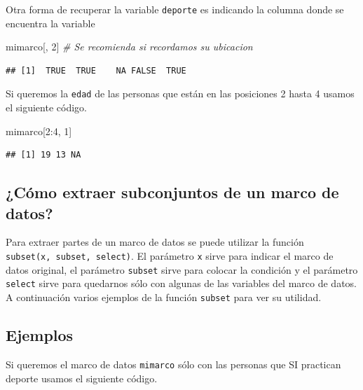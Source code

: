 \documentclass[10pt,]{krantz}
\makeatletter
\newenvironment{Shaded}{\begin{snugshade}}{\end{snugshade}}
\newcommand{\DecValTok}[1]{\textcolor[rgb]{0.00,0.00,0.81}{{#1}}}
\newcommand{\CommentTok}[1]{\textcolor[rgb]{0.56,0.35,0.01}{\textit{{#1}}}}
\newcommand{\NormalTok}[1]{{#1}}
\newenvironment{kframe}{%
\medskip{}
\setlength{\fboxsep}{.8em}
 \def\at@end@of@kframe{}%
 \ifinner\ifhmode%
  \def\at@end@of@kframe{\end{minipage}}%
  \begin{minipage}{\columnwidth}%
 \fi\fi%
 \def\FrameCommand##1{\hskip\@totalleftmargin \hskip-\fboxsep
 \colorbox{shadecolor}{##1}\hskip-\fboxsep
     \hskip-\linewidth \hskip-\@totalleftmargin \hskip\columnwidth}%
 \MakeFramed {\advance\hsize-\width
   \@totalleftmargin\z@ \linewidth\hsize
   \@setminipage}}%
 {\par\unskip\endMakeFramed%
 \at@end@of@kframe}
\renewenvironment{Shaded}{\begin{kframe}}{\end{kframe}}
\makeatother
\begin{document}
Otra forma de recuperar la variable \texttt{deporte} es indicando la
columna donde se encuentra la variable

\begin{Shaded}
\begin{Highlighting}[]
\NormalTok{mimarco[, }\DecValTok{2}\NormalTok{]  }\CommentTok{# Se recomienda si recordamos su ubicacion}
\end{Highlighting}
\end{Shaded}

\begin{verbatim}
## [1]  TRUE  TRUE    NA FALSE  TRUE
\end{verbatim}

Si queremos la \texttt{edad} de las personas que están en las posiciones
2 hasta 4 usamos el siguiente código.

\begin{Shaded}
\begin{Highlighting}[]
\NormalTok{mimarco[}\DecValTok{2}\NormalTok{:}\DecValTok{4}\NormalTok{, }\DecValTok{1}\NormalTok{]}
\end{Highlighting}
\end{Shaded}

\begin{verbatim}
## [1] 19 13 NA
\end{verbatim}

\subsection{\texorpdfstring{¿Cómo extraer subconjuntos de un marco de
datos?
}{¿Cómo extraer subconjuntos de un marco de datos? }}\label{como-extraer-subconjuntos-de-un-marco-de-datos}

Para extraer partes de un marco de datos se puede utilizar la función
\texttt{subset(x,\ subset,\ select)}. El parámetro \texttt{x} sirve para
indicar el marco de datos original, el parámetro \texttt{subset} sirve
para colocar la condición y el parámetro \texttt{select} sirve para
quedarnos sólo con algunas de las variables del marco de datos. A
continuación varios ejemplos de la función \texttt{subset} para ver su
utilidad.

\subsection*{Ejemplos}\label{ejemplos}


Si queremos el marco de datos \texttt{mimarco} sólo con las personas que
SI practican deporte usamos el siguiente código.
\end{document}

